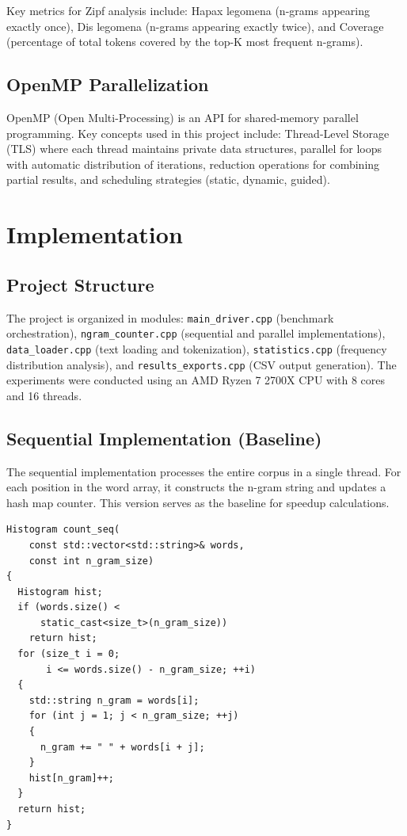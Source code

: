\documentclass[10pt,twocolumn,letterpaper]{article}
\begin{document}
Key metrics for Zipf analysis include: Hapax legomena (n-grams appearing exactly once), Dis legomena (n-grams appearing exactly twice), and Coverage (percentage of total tokens covered by the top-K most frequent n-grams).

\subsection{OpenMP Parallelization}

OpenMP (Open Multi-Processing) is an API for shared-memory parallel programming. Key concepts used in this project include: Thread-Level Storage (TLS) where each thread maintains private data structures, parallel for loops with automatic distribution of iterations, reduction operations for combining partial results, and scheduling strategies (static, dynamic, guided).

\section{Implementation}

\subsection{Project Structure}

The project is organized in modules: \texttt{main\_driver.cpp} (benchmark orchestration), \texttt{ngram\_counter.cpp} (sequential and parallel implementations), \texttt{data\_loader.cpp} (text loading and tokenization), \texttt{statistics.cpp} (frequency distribution analysis), and \texttt{results\_exports.cpp} (CSV output generation). The experiments were conducted using an AMD Ryzen 7 2700X CPU with 8 cores and 16 threads.

\subsection{Sequential Implementation (Baseline)}

The sequential implementation processes the entire corpus in a single thread. For each position in the word array, it constructs the n-gram string and updates a hash map counter. This version serves as the baseline for speedup calculations.

\begin{lstlisting}
Histogram count_seq(
    const std::vector<std::string>& words,
    const int n_gram_size)
{
  Histogram hist;
  if (words.size() < 
      static_cast<size_t>(n_gram_size)) 
    return hist;
  for (size_t i = 0; 
       i <= words.size() - n_gram_size; ++i)
  {
    std::string n_gram = words[i];
    for (int j = 1; j < n_gram_size; ++j)
    {
      n_gram += " " + words[i + j];
    }
    hist[n_gram]++;
  }
  return hist;
}
\end{lstlisting}
\end{document}
